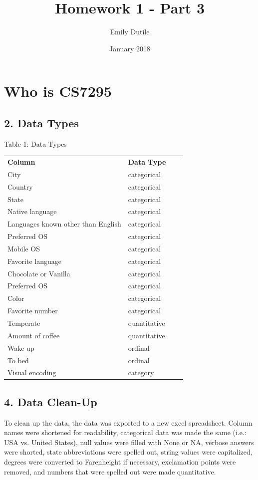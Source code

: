 \documentclass{neu_handout}
\title{Homework 1 - Part 3}
\author{Emily Dutile}
\date{January 2018}
\begin{document}
\section*{Who is CS7295}

\subsection*{2. Data Types}

\begin{center}
Table 1: Data Types
\end{center}
\begin{center} 
\begin{tabular}[h]{l l l l}
\textbf{Column} & \textbf{Data Type} \\
City & categorical \\
Country & categorical \\ 
State & categorical \\
Native language & categorical \\
Languages known other than English & categorical \\
Preferred OS & categorical \\
Mobile OS & categorical \\
Favorite language & categorical \\
Chocolate or Vanilla & categorical \\
Preferred OS & categorical \\
Color & categorical \\
Favorite number & categorical \\
Temperate & quantitative \\
Amount of coffee & quantitative \\
Wake up & ordinal \\
To bed & ordinal \\
Visual encoding & category
\end{tabular}
\end{center}

\subsection*{4. Data Clean-Up}
To clean up the data, the data was exported to a new excel spreadsheet. Column names were shortened for readability, categorical data was made the same (i.e.: USA vs. United States), null values were filled with None or NA, verbose answers were shorted, state abbreviations were spelled out, string values were capitalized, degrees were converted to Farenheight if necessary, exclamation points were removed, and numbers that were spelled out were made quantitative.\\
\end{document}
